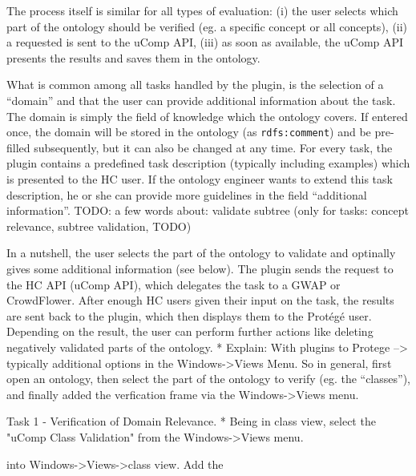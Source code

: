 The process itself is similar for all types of evaluation: (i) the user selects which part of the ontology 
should be verified (eg. a specific concept or all concepts), (ii) a requested is sent to the uComp API, 
(iii) as soon as available, the uComp API presents the results and saves them in the ontology.


What is common among all tasks handled by the plugin, is the selection of a ``domain'' and that the user can provide
additional information about the task. The domain is simply the field of knowledge which the ontology covers. If entered
once, the domain will be stored in the ontology (as \texttt{rdfs:comment}) and be pre-filled subsequently, but it can also be changed at any time.
For every task, the plugin contains a predefined task description (typically including examples) which is presented to the HC user.
If the ontology engineer wants to extend this task description, he or she can provide more guidelines 
in the field ``additional information''.
TODO: a few words about: validate subtree (only for tasks: concept relevance, subtree validation, TODO)


In a nutshell, the user selects the part of the ontology to validate and optinally gives some additional information (see below). 
The plugin sends the request to the HC API (uComp API), which delegates the task to a GWAP or CrowdFlower. 
After enough HC users given their input on the task, the results are sent back to the plugin, which then displays them to the Protégé user. Depending on the result, the user can perform further actions like deleting negatively validated parts of the ontology.
* Explain: With plugins to Protege --> typically additional options in the Windows->Views Menu. 
  So in general, first open an ontology, then select the part of the ontology to verify (eg. the ``classes''), and finally 
  added the verfication frame via the Windows->Views menu.


Task 1 - Verification of Domain Relevance.
* Being in class view, select the "uComp Class Validation" from the Windows->Views menu. 

into Windows->Views->class view. Add the 


